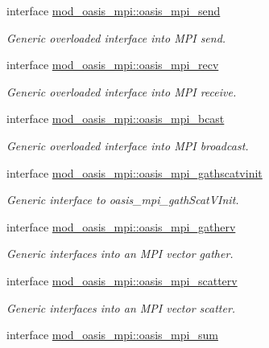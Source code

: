 \begin{DoxyCompactItemize}
\item 
interface \hyperlink{interfacemod__oasis__mpi_1_1oasis__mpi__send}{mod\+\_\+oasis\+\_\+mpi\+::oasis\+\_\+mpi\+\_\+send}
\begin{DoxyCompactList}\small\item\em Generic overloaded interface into M\+PI send. \end{DoxyCompactList}\item 
interface \hyperlink{interfacemod__oasis__mpi_1_1oasis__mpi__recv}{mod\+\_\+oasis\+\_\+mpi\+::oasis\+\_\+mpi\+\_\+recv}
\begin{DoxyCompactList}\small\item\em Generic overloaded interface into M\+PI receive. \end{DoxyCompactList}\item 
interface \hyperlink{interfacemod__oasis__mpi_1_1oasis__mpi__bcast}{mod\+\_\+oasis\+\_\+mpi\+::oasis\+\_\+mpi\+\_\+bcast}
\begin{DoxyCompactList}\small\item\em Generic overloaded interface into M\+PI broadcast. \end{DoxyCompactList}\item 
interface \hyperlink{interfacemod__oasis__mpi_1_1oasis__mpi__gathscatvinit}{mod\+\_\+oasis\+\_\+mpi\+::oasis\+\_\+mpi\+\_\+gathscatvinit}
\begin{DoxyCompactList}\small\item\em Generic interface to oasis\+\_\+mpi\+\_\+gath\+Scat\+V\+Init. \end{DoxyCompactList}\item 
interface \hyperlink{interfacemod__oasis__mpi_1_1oasis__mpi__gatherv}{mod\+\_\+oasis\+\_\+mpi\+::oasis\+\_\+mpi\+\_\+gatherv}
\begin{DoxyCompactList}\small\item\em Generic interfaces into an M\+PI vector gather. \end{DoxyCompactList}\item 
interface \hyperlink{interfacemod__oasis__mpi_1_1oasis__mpi__scatterv}{mod\+\_\+oasis\+\_\+mpi\+::oasis\+\_\+mpi\+\_\+scatterv}
\begin{DoxyCompactList}\small\item\em Generic interfaces into an M\+PI vector scatter. \end{DoxyCompactList}\item 
interface \hyperlink{interfacemod__oasis__mpi_1_1oasis__mpi__sum}{mod\+\_\+oasis\+\_\+mpi\+::oasis\+\_\+mpi\+\_\+sum}

\end{DoxyCompactItemize}

